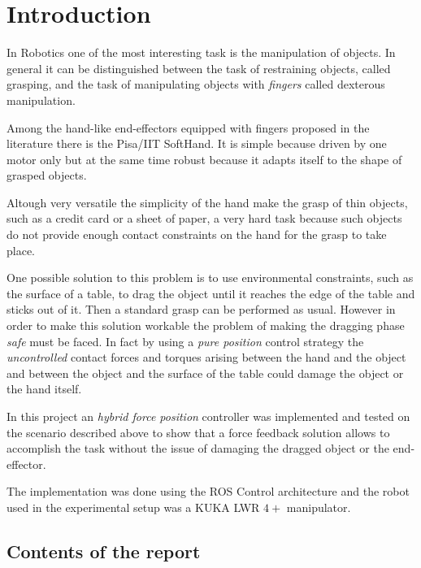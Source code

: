 \section{Introduction}
In Robotics one of the most interesting task is the manipulation of objects. In general
it can be distinguished between the task of restraining objects, called grasping,
and the task of manipulating objects with \emph{fingers} called dexterous manipulation.
\par
Among the hand-like end-effectors equipped with fingers proposed in the literature
there is the Pisa/IIT SoftHand. It is simple because driven by one motor only
but at the same time robust because it adapts itself to the shape of grasped objects.
\par
Altough very versatile the simplicity of the hand make the grasp of thin objects,
such as a credit card or a sheet of paper, a very hard task
because such objects do not provide enough contact constraints on the hand
for the grasp to take place.
\par
One possible solution to this problem is to use environmental constraints, such as
the surface of a table, to drag the object until it reaches the edge of the table and
sticks out of it. Then a standard grasp can be performed as usual. However in order to make
this solution workable the problem of making the dragging phase \emph{safe} must be faced.
In fact by using a \emph{pure position} control strategy the \emph{uncontrolled} contact forces and torques
arising between the hand and the object and between the object and the surface of the table
could damage the object or the hand itself.
\par
In this project an \emph{hybrid force position} controller was implemented and tested on the
scenario described above to show that a force feedback solution allows to accomplish the task
without the issue of damaging the dragged object or the end-effector.
\par
The implementation was done using the ROS Control architecture and the robot used
in the experimental setup was a KUKA LWR $4+$ manipulator.

\subsection{Contents of the report}

\newpage
